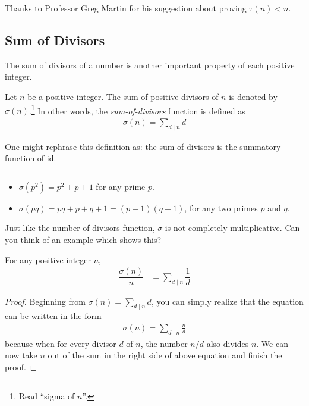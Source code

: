 		\begin{remark}
			Thanks to Professor Greg Martin for his suggestion about proving $\tau(n)<n$.
		\end{remark}
\subsection{Sum of Divisors}\label{sec:sum-of-divisors}
	The sum of divisors of a number is another important property of each positive integer.

	\begin{definition}
		Let $n$ be a positive integer. The sum of positive divisors of $n$ is denoted by $\sigma(n)$.\footnote{Read ``sigma of $n$''.} In other words, the \textit{sum-of-divisors} function is defined as
		\begin{align*}
		\sigma(n)=\sum_{d\mid n} d
		\end{align*}
	\end{definition}

	\begin{note}
		One might rephrase this definition as: the sum-of-divisors is the summatory function of $\text{id}$.
	\end{note}

	\begin{example}
		$ $
		\begin{itemize}
			\item $\sigma(p^2) = p^2+p+1$ for any prime $p$.
			\item $\sigma(pq)=pq+p+q+1=(p+1)(q+1)$, for any two primes $p$ and $q$.
		\end{itemize}
	\end{example}



	\begin{note}
		Just like the number-of-divisors function, $\sigma$ is not completely multiplicative. Can you think of an example which shows this?
	\end{note}

	\begin{theorem}\label{thm:sodfrac}
		For any positive integer $n$,
			\begin{align*}
				\dfrac{\sigma (n)}{n} & = \sum_{d\mid n}\dfrac{1}{d}
			\end{align*}
	\end{theorem}

	\begin{proof}
		Beginning from $\sigma(n) = \sum\limits_{d\mid n} d$, you can simply realize that the equation can be written in the form
		\begin{align*}
		\sigma(n) = \sum_{d\mid n} \frac{n}{d}
		\end{align*}
		because when for every divisor $d$ of $n$, the number $n/d$ also divides $n$. We can now take $n$ out of the sum in the right side of above equation and finish the proof.
	\end{proof}

